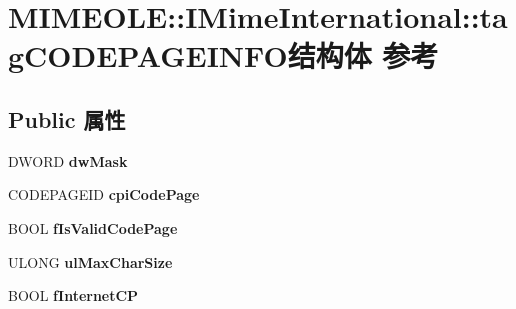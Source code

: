 \hypertarget{struct_m_i_m_e_o_l_e_1_1_i_mime_international_1_1tag_c_o_d_e_p_a_g_e_i_n_f_o}{}\section{M\+I\+M\+E\+O\+LE\+:\+:I\+Mime\+International\+:\+:tag\+C\+O\+D\+E\+P\+A\+G\+E\+I\+N\+F\+O结构体 参考}
\label{struct_m_i_m_e_o_l_e_1_1_i_mime_international_1_1tag_c_o_d_e_p_a_g_e_i_n_f_o}
\subsection*{Public 属性}
\begin{DoxyCompactItemize}
\item 
\mbox{\label{struct_m_i_m_e_o_l_e_1_1_i_mime_international_1_1tag_c_o_d_e_p_a_g_e_i_n_f_o_ad6badd5705136efd67b02153a1b7e14c}} 
D\+W\+O\+RD {\bfseries dw\+Mask}
\item 
\mbox{\label{struct_m_i_m_e_o_l_e_1_1_i_mime_international_1_1tag_c_o_d_e_p_a_g_e_i_n_f_o_a19f79e1e03bd7341150a621bd23cd871}} 
C\+O\+D\+E\+P\+A\+G\+E\+ID {\bfseries cpi\+Code\+Page}
\item 
\mbox{\label{struct_m_i_m_e_o_l_e_1_1_i_mime_international_1_1tag_c_o_d_e_p_a_g_e_i_n_f_o_ae959321ba8825783190433ecc0486fdc}} 
B\+O\+OL {\bfseries f\+Is\+Valid\+Code\+Page}
\item 
\mbox{\label{struct_m_i_m_e_o_l_e_1_1_i_mime_international_1_1tag_c_o_d_e_p_a_g_e_i_n_f_o_a0b2b32539c3c2c69df4a7dc7cca68d76}} 
U\+L\+O\+NG {\bfseries ul\+Max\+Char\+Size}
\item 
\mbox{\label{struct_m_i_m_e_o_l_e_1_1_i_mime_international_1_1tag_c_o_d_e_p_a_g_e_i_n_f_o_ad69b200f54bcd90caf18bd7026cd9cd2}} 
B\+O\+OL {\bfseries f\+Internet\+CP}
\item 

\end{DoxyCompactItemize}
